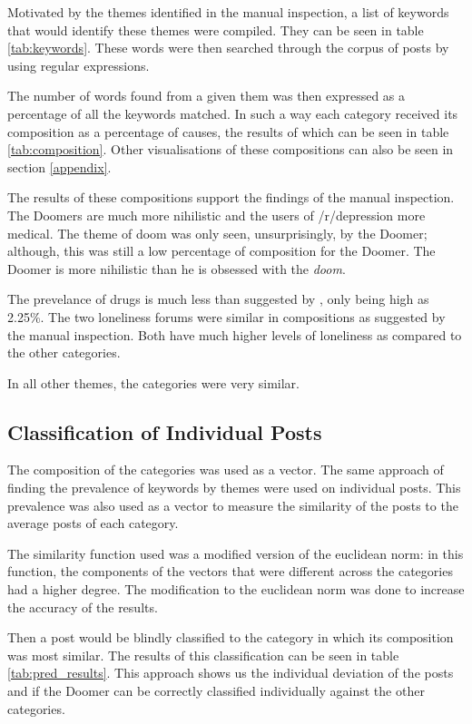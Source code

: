 \documentclass[../report.tex]{subfiles}
\begin{document}
Motivated by the themes identified in the manual inspection, a list of keywords that would identify these themes were compiled. 
They can be seen in table \ref{tab:keywords}.
These words were then searched through the corpus of posts by using regular expressions.

The number of words found from a given them was then expressed as a percentage of all the keywords matched.
In such a way each category received its composition as a percentage of causes, the results of which can be seen in table \ref{tab:composition}.
Other visualisations of these compositions can also be seen in section \ref{appendix}.

The results of these compositions support the findings of the manual inspection. 
The Doomers are much more nihilistic and the users of /r/depression more medical.
The theme of doom was only seen, unsurprisingly, by the Doomer; although, this was still a low percentage of composition for the Doomer. 
The Doomer is more nihilistic than he is obsessed with the \textit{doom}.

The prevelance of drugs is much less than suggested by \cite*{twitter_loneliness}, only being high as 2.25\%.
The two loneliness forums were similar in compositions as suggested by the manual inspection. 
Both have much higher levels of loneliness as compared to the other categories. 

In all other themes, the categories were very similar. 



\subsection{Classification of Individual Posts}
The composition of the categories was used as a vector. 
The same approach of finding the prevalence of keywords by themes were used on individual posts.
This prevalence was also used as a vector to measure the similarity of the posts to the average posts of each category. 

The similarity function used was a modified version of the euclidean norm: in this function, the components of the vectors that were different across the categories had a higher degree. 
The modification to the euclidean norm was done to increase the accuracy of the results.

Then a post would be blindly classified to the category in which its composition was most similar. 
The results of this classification can be seen in table \ref{tab:pred_results}.
This approach shows us the individual deviation of the posts and if the Doomer can be correctly classified individually against the other categories.
\end{document}
